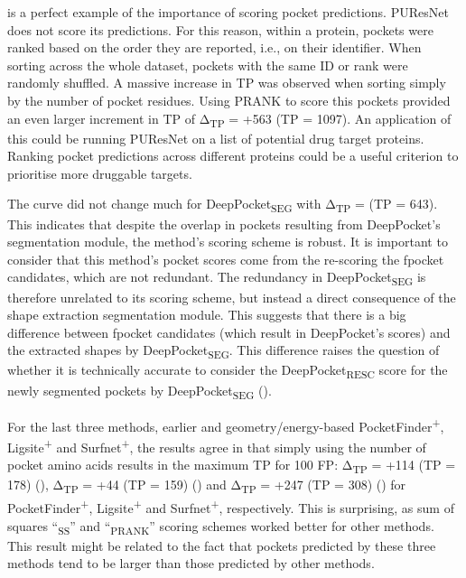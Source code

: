  is a perfect example of the importance of scoring pocket predictions. PUResNet does not score its predictions. For this reason, within a protein, pockets were ranked based on the order they are reported, i.e., on their identifier. When sorting across the whole dataset, pockets with the same ID or rank were randomly shuffled. A massive increase in TP was observed when sorting simply by the number of pocket residues. Using PRANK to score this pockets provided an even larger increment in TP of Δ\textsubscript{TP} = +563 (TP = 1097). An application of this could be running PUResNet on a list of potential drug target proteins. Ranking pocket predictions across different proteins could be a useful criterion to prioritise more druggable targets.

The curve did not change much for DeepPocket\textsubscript{SEG} with Δ\textsubscript{TP} =  (TP = 643). This indicates that despite the overlap in pockets resulting from DeepPocket's segmentation module, the method's scoring scheme is robust. It is important to consider that this method's pocket scores come from the re-scoring the fpocket candidates, which are not redundant. The redundancy in DeepPocket\textsubscript{SEG} is therefore unrelated to its scoring scheme, but instead a direct consequence of the shape extraction segmentation module. This suggests that there is a big difference between fpocket candidates (which result in DeepPocket's scores) and the extracted shapes by DeepPocket\textsubscript{SEG}. This difference raises the question of whether it is technically accurate to consider the DeepPocket\textsubscript{RESC} score for the newly segmented pockets by DeepPocket\textsubscript{SEG} ().

For the last three methods, earlier and geometry/energy-based PocketFinder\textsuperscript{+}, Ligsite\textsuperscript{+} and Surfnet\textsuperscript{+}, the results agree in that simply using the number of pocket amino acids results in the maximum TP for 100 FP: Δ\textsubscript{TP} = +114 (TP = 178) (), Δ\textsubscript{TP} = +44 (TP = 159) () and Δ\textsubscript{TP} = +247 (TP = 308) () for PocketFinder\textsuperscript{+}, Ligsite\textsuperscript{+} and Surfnet\textsuperscript{+}, respectively. This is surprising, as sum of squares ``\textsubscript{SS}'' and ``\textsubscript{PRANK}'' scoring schemes worked better for other methods. This result might be related to the fact that pockets predicted by these three methods tend to be larger than those predicted by other methods.

